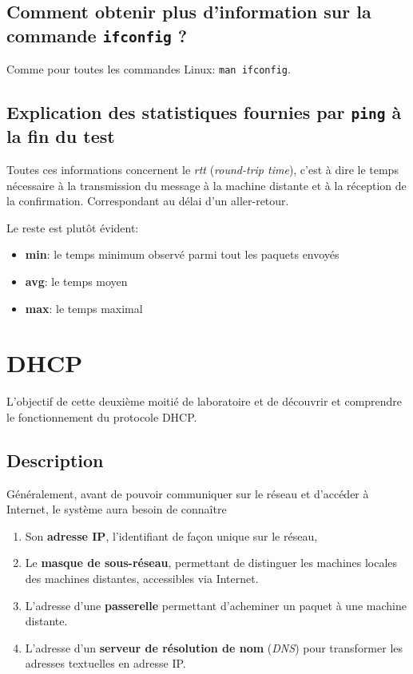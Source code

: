 \documentclass[11pt,a4paper]{article}
\begin{document}
\subsection{Comment obtenir plus d'information sur la commande \texttt{ifconfig} ?}

Comme pour toutes les commandes Linux: \texttt{man ifconfig}.

\subsection{Explication des statistiques fournies par \texttt{ping} à la fin du test}

Toutes ces informations concernent le \textit{rtt} (\textit{round-trip time}), c'est à dire le temps nécessaire à la transmission du message à la machine distante et à la réception de la confirmation. Correspondant au délai d'un aller-retour.

Le reste est plutôt évident:

\begin{itemize}
	\item \textbf{min}: le temps minimum observé parmi tout les paquets envoyés
	\item \textbf{avg}: le temps moyen
	\item \textbf{max}: le temps maximal
\end{itemize}

\section{DHCP}

L'objectif de cette deuxième moitié de laboratoire et de découvrir et comprendre le fonctionnement du protocole DHCP.

\subsection{Description}



Généralement, avant de pouvoir communiquer sur le réseau et d'accéder à Internet, le système aura besoin de connaître

\begin{enumerate}
	\item Son \textbf{adresse IP}, l'identifiant de façon unique sur le réseau,
	\item Le \textbf{masque de sous-réseau}, permettant de distinguer les machines locales des machines distantes, accessibles via Internet.
	\item L'adresse d'une \textbf{passerelle} permettant d'acheminer un paquet à une machine distante.
	\item L'adresse d'un \textbf{serveur de résolution de nom} (\textit{DNS}) pour transformer les adresses textuelles en adresse IP.
\end{enumerate}
\end{document}
